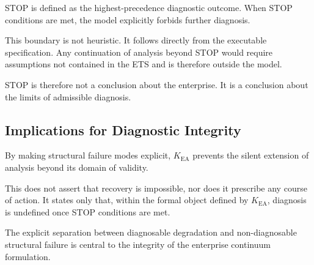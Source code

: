 STOP is defined as the highest-precedence diagnostic outcome.
When STOP conditions are met, the model explicitly forbids further
diagnosis.

This boundary is not heuristic.
It follows directly from the executable specification.
Any continuation of analysis beyond STOP would require assumptions not
contained in the ETS and is therefore outside the model.

STOP is therefore not a conclusion about the enterprise.
It is a conclusion about the limits of admissible diagnosis.

\subsection{Implications for Diagnostic Integrity}

By making structural failure modes explicit, $K_{\mathrm{EA}}$ prevents
the silent extension of analysis beyond its domain of validity.

This does not assert that recovery is impossible, nor does it prescribe
any course of action.
It states only that, within the formal object defined by
$K_{\mathrm{EA}}$, diagnosis is undefined once STOP conditions are met.

The explicit separation between diagnosable degradation and
non-diagnosable structural failure is central to the integrity of the
enterprise continuum formulation.

